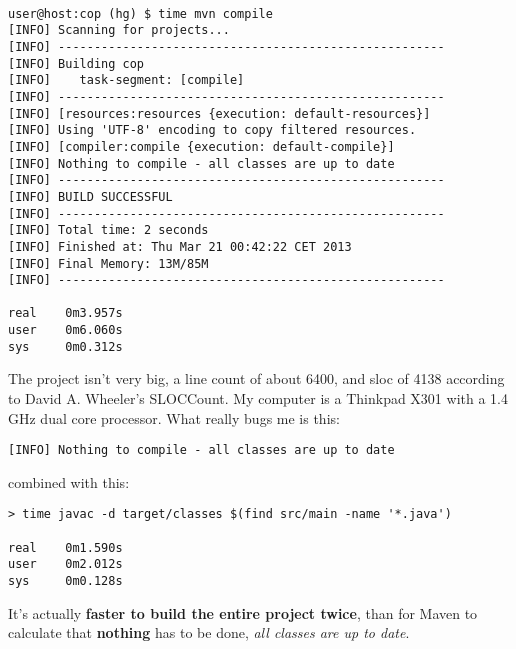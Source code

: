 {\small
\begin{verbatim}

user@host:cop (hg) $ time mvn compile
[INFO] Scanning for projects...
[INFO] ------------------------------------------------------
[INFO] Building cop
[INFO]    task-segment: [compile]
[INFO] ------------------------------------------------------
[INFO] [resources:resources {execution: default-resources}]
[INFO] Using 'UTF-8' encoding to copy filtered resources.
[INFO] [compiler:compile {execution: default-compile}]
[INFO] Nothing to compile - all classes are up to date
[INFO] ------------------------------------------------------
[INFO] BUILD SUCCESSFUL
[INFO] ------------------------------------------------------
[INFO] Total time: 2 seconds
[INFO] Finished at: Thu Mar 21 00:42:22 CET 2013
[INFO] Final Memory: 13M/85M
[INFO] ------------------------------------------------------

real    0m3.957s
user    0m6.060s
sys     0m0.312s
\end{verbatim}
}


The project isn't very big, a line count of about 6400, and sloc of
4138 according to David A. Wheeler's SLOCCount. My computer is a Thinkpad
X301 with a 1.4 GHz dual core processor. What really bugs me is this:


{\small
\begin{verbatim}
[INFO] Nothing to compile - all classes are up to date
\end{verbatim}
}


combined with this:


{\small
\begin{verbatim}
> time javac -d target/classes $(find src/main -name '*.java')

real    0m1.590s
user    0m2.012s
sys     0m0.128s
\end{verbatim}
}


It's actually \textbf{faster to build the entire project twice}, than for Maven
to calculate that \textbf{nothing} has to be done, \textit{all classes are up to date}.
